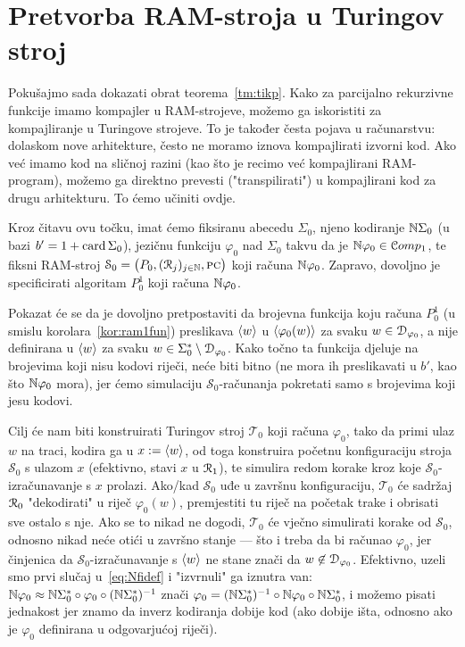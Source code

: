 \section{Pretvorba RAM-stroja u Turingov stroj}

Pokušajmo sada dokazati obrat teorema~\ref{tm:tikp}. Kako za parcijalno rekurzivne funkcije imamo kompajler u RAM-strojeve, možemo ga iskoristiti za kompajliranje u Turingove strojeve. To je također česta pojava u računarstvu: dolaskom nove arhitekture, često ne moramo iznova kompajlirati izvorni kod. Ako već imamo kod na sličnoj razini (kao što je recimo već kompajlirani RAM-program), možemo ga direktno prevesti ("transpilirati") u kompajlirani kod za drugu arhitekturu. To ćemo učiniti ovdje.

Kroz čitavu ovu točku, imat ćemo fiksiranu abecedu $\Sigma_0$, njeno kodiranje ${\mathbb N}\Sigma_0$ (u bazi $b'=1+\operatorname{card}\Sigma_0$), jezičnu funkciju $\varphi_0$ nad $\Sigma_0$ takvu da je ${\mathbb N}\varphi_0\in\mathcal Comp_1$, te fiksni RAM-stroj $\mathcal S_0=\bigl(P_0,(\mathcal R_{j})_{j\in{\mathbb N}},\textsc{pc}\bigr)$ koji računa ${\mathbb N}\varphi_0$. Zapravo, dovoljno je specificirati algoritam $P_0^1$ koji računa ${\mathbb N}\varphi_0$. 

\begin{napomena}
Pokazat će se da je dovoljno pretpostaviti da brojevna funkcija koju računa $P_0^1$ (u smislu korolara~\ref{kor:ram1fun}) preslikava $\langle w\rangle$ u $\langle\varphi_0(w)\rangle$ za svaku $w\in\mathcal D_{\varphi_0}$, a nije definirana u $\langle w\rangle$ za svaku $w\in\Sigma_0^*\setminus\mathcal D_{\varphi_0}$. Kako točno ta funkcija djeluje na brojevima koji nisu kodovi riječi, neće biti bitno (ne mora ih preslikavati u $b'$, kao što ${\mathbb N}\varphi_0$ mora), jer ćemo simulaciju $\mathcal S_0$-računanja pokretati samo s brojevima koji jesu kodovi.
\end{napomena}

Cilj će nam biti konstruirati Turingov stroj $\mathcal T_0$ koji računa $\varphi_0$, tako da primi ulaz $w$ na traci, kodira ga u $x:=\langle w\rangle$, od toga konstruira početnu  konfiguraciju stroja $\mathcal S_0$ s ulazom $x$ (efektivno, stavi $x$ u $\mathcal R_{1}$), te simulira redom korake kroz koje $\mathcal S_0$-izračunavanje s $x$ prolazi. Ako\slash kad $\mathcal S_0$ uđe u završnu konfiguraciju, $\mathcal T_0$ će sadržaj $\mathcal R_{0}$ "dekodirati" u riječ $\varphi_0(w)$, premjestiti tu riječ na početak trake i obrisati sve ostalo s nje. Ako se to nikad ne dogodi, $\mathcal T_0$ će vječno simulirati korake od $\mathcal S_0$, odnosno nikad neće otići u završno stanje --- što i treba da bi računao $\varphi_0$, jer činjenica da $\mathcal S_0$-izračunavanje s $\langle w\rangle$ ne stane znači da $w\not\in\mathcal D_{\varphi_0}$. Efektivno, uzeli smo prvi slučaj u~\eqref{eq:Nfidef} i "izvrnuli" ga iznutra van: ${\mathbb N}\varphi_0\approx{\mathbb N}\Sigma_0^*\circ\varphi_0\circ({\mathbb N}\Sigma_0^*)^{-1}$ znači $\varphi_0=({\mathbb N}\Sigma_0^*)^{-1}\circ{\mathbb N}\varphi_0\circ{\mathbb N}\Sigma_0^*$, i možemo pisati jednakost jer znamo da inverz kodiranja dobije kod (ako dobije išta, odnosno ako je $\varphi_0$ definirana u odgovarjućoj riječi).


